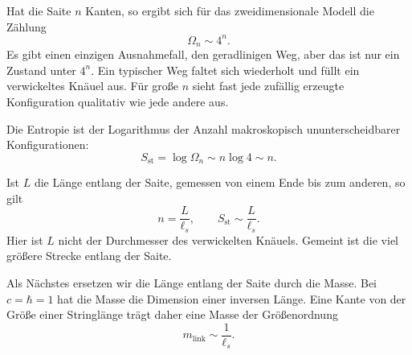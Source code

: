 Hat die Saite \(n\) Kanten, so ergibt sich für das zweidimensionale Modell die Zählung
\begin{equation}
\Omega_n\sim4^n.
\label{eq:l06-walk-count}
\end{equation}
Es gibt einen einzigen Ausnahmefall, den geradlinigen Weg, aber das ist nur ein Zustand unter \(4^n\). Ein typischer Weg faltet sich wiederholt und füllt ein verwickeltes Knäuel aus. Für große \(n\) sieht fast jede zufällig erzeugte Konfiguration qualitativ wie jede andere aus.

Die Entropie ist der Logarithmus der Anzahl makroskopisch ununterscheidbarer Konfigurationen:
\begin{equation}
S_{\mathrm{st}}=\log\Omega_n\sim n\log4\sim n.
\label{eq:l06-string-entropy-n}
\end{equation}

\begin{classroomqa}\end{classroomqa}

Ist \(L\) die Länge entlang der Saite, gemessen von einem Ende bis zum anderen, so gilt
\begin{equation}
n=\frac{L}{\ell_s},
\qquad
S_{\mathrm{st}}\sim\frac{L}{\ell_s}.
\label{eq:l06-string-entropy-length}
\end{equation}
Hier ist \(L\) nicht der Durchmesser des verwickelten Knäuels. Gemeint ist die viel größere Strecke entlang der Saite.

Als Nächstes ersetzen wir die Länge entlang der Saite durch die Masse. Bei \(c=\hbar=1\) hat die Masse die Dimension einer inversen Länge. Eine Kante von der Größe einer Stringlänge trägt daher eine Masse der Größenordnung
\begin{equation}
m_{\mathrm{link}}\sim\frac{1}{\ell_s}.
\label{eq:l06-link-mass}
\end{equation}

\begin{classroomqa}\end{classroomqa}

